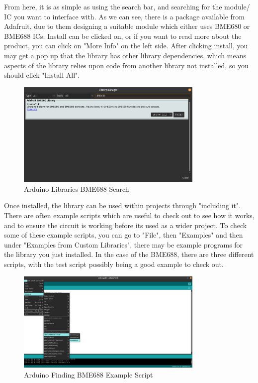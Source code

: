 \documentclass[a4paper,11pt]{report}
\begin{document}
From here, it is as simple as using the search bar, and searching for the module/ IC you want to interface with. As we can see, there is a package available from Adafruit, due to them designing a suitable module which either uses BME680 or BME688 ICs. Install can be clicked on, or if you want to read more about the product, you can click on "More Info" on the left side. After clicking install, you may get a pop up that the library has other library dependencies, which means aspects of the library relies upon code from another library not installed, so you should click "Install All".

\begin{figure}[H]
\centering
\includegraphics[width=0.8\textwidth]{screenshots/arduinolibrariessearch}
\caption{Arduino Libraries BME688 Search}
\end{figure}

Once installed, the library can be used within projects through "including it". There are often example scripts which are useful to check out to see how it works, and to ensure the circuit is working before its used as a wider project. To check some of these example scripts, you can go to "File", then "Examples" and then under "Examples from Custom Libraries", there may be example programs for the library you just installed. In the case of the BME688, there are three different scripts, with the test script possibly being a good example to check out.

\begin{figure}[H]
\centering
\includegraphics[width=0.8\textwidth]{screenshots/arduinobme688examplescriptfind}
\caption{Arduino Finding BME688 Example Script}
\end{figure}
\end{document}
